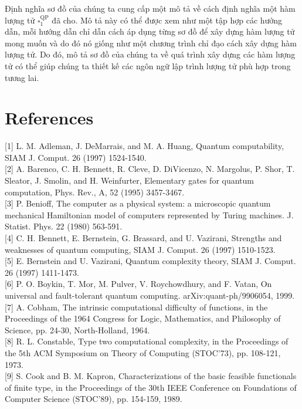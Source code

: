 \documentclass[10pt]{article}
\begin{document}
Định nghĩa sơ đồ của chúng ta cung cấp một mô tả về cách định nghĩa một hàm lượng tử $\square_{1}^{\mathrm{QP}}$ đã cho. Mô tả này có thể được xem như một tập hợp các hướng dẫn, mỗi hướng dẫn chỉ dẫn cách áp dụng từng sơ đồ để xây dựng hàm lượng tử mong muốn và do đó nó giống như một chương trình chỉ đạo cách xây dựng hàm lượng tử. Do đó, mô tả sơ đồ của chúng ta về quá trình xây dựng các hàm lượng tử có thể giúp chúng ta thiết kế các ngôn ngữ lập trình lượng tử phù hợp trong tương lai.

\section*{References}
[1] L. M. Adleman, J. DeMarrais, and M. A. Huang, Quantum computability, SIAM J. Comput. 26 (1997) 1524-1540.\\[0pt]
[2] A. Barenco, C. H. Bennett, R. Cleve, D. DiVicenzo, N. Margolus, P. Shor, T. Sleator, J. Smolin, and H. Weinfurter, Elementary gates for quantum computation, Phys. Rev., A, 52 (1995) 3457-3467.\\[0pt]
[3] P. Benioff, The computer as a physical system: a microscopic quantum mechanical Hamiltonian model of computers represented by Turing machines. J. Statist. Phys. 22 (1980) 563-591.\\[0pt]
[4] C. H. Bennett, E. Bernstein, G. Brassard, and U. Vazirani, Strengths and weaknesses of quantum computing, SIAM J. Comput. 26 (1997) 1510-1523.\\[0pt]
[5] E. Bernstein and U. Vazirani, Quantum complexity theory, SIAM J. Comput. 26 (1997) 1411-1473.\\[0pt]
[6] P. O. Boykin, T. Mor, M. Pulver, V. Roychowdhury, and F. Vatan, On universal and fault-tolerant quantum computing. arXiv:quant-ph/9906054, 1999.\\[0pt]
[7] A. Cobham, The intrinsic computational difficulty of functions, in the Proceedings of the 1964 Congress for Logic, Mathematics, and Philosophy of Science, pp. 24-30, North-Holland, 1964.\\[0pt]
[8] R. L. Constable, Type two computational complexity, in the Proceedings of the 5th ACM Symposium on Theory of Computing (STOC'73), pp. 108-121, 1973.\\[0pt]
[9] S. Cook and B. M. Kapron, Characterizations of the basic feasible functionals of finite type, in the Proceedings of the 30th IEEE Conference on Foundations of Computer Science (STOC'89), pp. 154-159, 1989.\\[0pt]
\end{document}
